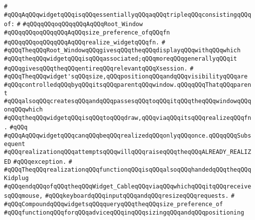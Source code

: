 \verb|#|\newline
\verb|#qQQqAqQQqwidgetqQQqisqQQqessentiallyqQQqaqQQqtripleqQQqconsistingqQQqof:|\newline
\verb|#|\newline
\verb|#qQQqqQQqoqQQqqQQqAqQQqRoot_Window|\newline
\verb|#qQQqqQQqoqQQqqQQqAqQQqsize_preference_ofqQQqfn|\newline
\verb|#qQQqqQQqoqQQqqQQqAqQQqrealize_widgetqQQqfn.|\newline
\verb|#|\newline
\verb|#qQQqTheqQQqRoot_WindowqQQqgivesqQQqtheqQQqdisplayqQQqwithqQQqwhich|\newline
\verb|#qQQqtheqQQqwidgetqQQqisqQQqassociated;qQQqmoreqQQqgenerallyqQQqit|\newline
\verb|#qQQqgivesqQQqtheqQQqentireqQQqrelevantqQQqXsession.|\newline
\verb|#|\newline
\verb|#qQQqTheqQQqwidget'sqQQqsize,qQQqpositionqQQqandqQQqvisibilityqQQqare|\newline
\verb|#qQQqcontrolledqQQqbyqQQqitsqQQqparentqQQqwindow.qQQqqQQqThatqQQqparent|\newline
\verb|#qQQqalsoqQQqcreatesqQQqandqQQqpassesqQQqtoqQQqitqQQqtheqQQqwindowqQQqonqQQqwhich|\newline
\verb|#qQQqtheqQQqwidgetqQQqisqQQqtoqQQqdraw,qQQqviaqQQqitsqQQqrealizeqQQqfn.|\newline
\verb|#qQQq|\newline
\verb|#qQQqAqQQqwidgetqQQqcanqQQqbeqQQqrealizedqQQqonlyqQQqonce.qQQqqQQqSubsequent|\newline
\verb|#qQQqrealizationqQQqattemptsqQQqwillqQQqraiseqQQqtheqQQqALREADY_REALIZED|\newline
\verb|#qQQqexception.|\newline
\verb|#|\newline
\verb|#qQQqTheqQQqrealizationqQQqfunctionqQQqisqQQqalsoqQQqhandedqQQqtheqQQqKidplug|\newline
\verb|#qQQqendqQQqofqQQqtheqQQqWidget_CableqQQqviaqQQqwhichqQQqitqQQqreceivesqQQqmouse,|\newline
\verb|#qQQqkeyboardqQQqinputqQQqandqQQqresizeqQQqrequests.|\newline
\verb|#|\newline
\verb|#qQQqCompoundqQQqwidgetsqQQqqueryqQQqtheqQQqsize_preference_of|\newline
\verb|#qQQqfunctionqQQqforqQQqadviceqQQqinqQQqsizingqQQqandqQQqpositioning|\newline
